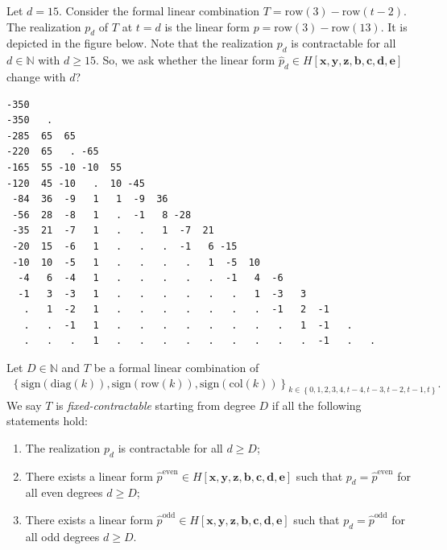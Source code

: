 \begin{example}
    Let \( d = 15 \). Consider the formal linear combination \( T = \mathrm{row}(3) - \mathrm{row}(t - 2) \). The realization \( p_d \) of \( T \) at \( t = d \) is the linear form \( p = \mathrm{row}(3) - \mathrm{row}(13) \). It is depicted in the figure below. Note that the realization \( p_d \) is contractable for all \( d \in \mathbb{N} \) with \( d \geq 15 \). So, we ask whether the linear form \( \hat p_d \in H[\mathbf{x}, \mathbf{y}, \mathbf{z}, \mathbf{b}, \mathbf{c}, \mathbf{d}, \mathbf{e}]\) change with \( d \)? 

    \pagebreak
    \begin{verbatim}
-350 
-350   . 
-285  65  65 
-220  65   . -65 
-165  55 -10 -10  55 
-120  45 -10   .  10 -45 
 -84  36  -9   1   1  -9  36 
 -56  28  -8   1   .  -1   8 -28 
 -35  21  -7   1   .   .   1  -7  21 
 -20  15  -6   1   .   .   .  -1   6 -15 
 -10  10  -5   1   .   .   .   .   1  -5  10 
  -4   6  -4   1   .   .   .   .   .  -1   4  -6 
  -1   3  -3   1   .   .   .   .   .   .   1  -3   3 
   .   1  -2   1   .   .   .   .   .   .   .  -1   2  -1 
   .   .  -1   1   .   .   .   .   .   .   .   .   1  -1   . 
   .   .   .   1   .   .   .   .   .   .   .   .   .  -1   .   .         
    \end{verbatim}
    
\end{example}

\begin{definition}
    Let \( D \in \mathbb{N} \) and \( T \) be a formal linear combination of
    \begin{align*}
        \left\{ \mathrm{sign}(\mathrm{diag}(k)), \mathrm{sign}(\mathrm{row}(k)), \mathrm{sign}(\mathrm{col}(k)) \right\}_{k \in \left\{ 0,1,2,3,4,t-4,t-3,t-2,t-1,t \right\}}.
    \end{align*}
    We say \( T \) is \emph{fixed-contractable} starting from degree \( D \) if all the following statements hold:
    \begin{enumerate}
        \item The realization \( p_d \) is contractable for all \( d \geq D \);
        \item There exists a linear form \( \hat p^{\mathrm{even}} \in H[\mathbf{x}, \mathbf{y}, \mathbf{z}, \mathbf{b}, \mathbf{c}, \mathbf{d}, \mathbf{e}] \) such that \( p_d = \hat p^{\mathrm{even}} \) for all even degrees \(  d \geq D  \);
        \item There exists a linear form \( \hat p^{\mathrm{odd}} \in H[\mathbf{x}, \mathbf{y}, \mathbf{z}, \mathbf{b}, \mathbf{c}, \mathbf{d}, \mathbf{e}] \) such that \( p_d = \hat p^{\mathrm{odd}} \) for all odd degrees \( d \geq D  \).
    \end{enumerate}
\end{definition}


